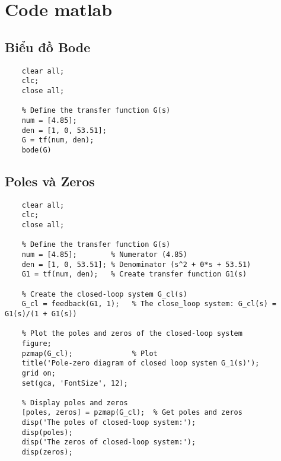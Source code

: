 \chapter{Code matlab}
    \section{Biểu đồ Bode}
    \begin{lstlisting}[caption={Code vẽ biểu đồ Bode}, label={lst:bode}]
    % Delete all variables and close all figures
    clear all;
    clc;
    close all;

    % Define the transfer function G(s)
    num = [4.85];
    den = [1, 0, 53.51];
    G = tf(num, den);
    bode(G)
    \end{lstlisting}
    \section{Poles và Zeros}
    \begin{lstlisting}[caption={Code vẽ poles và zeros}, label={lst:pz}]
    % Delete all variables and close all figures
    clear all;
    clc;
    close all;
    
    % Define the transfer function G(s)
    num = [4.85];        % Numerator (4.85)
    den = [1, 0, 53.51]; % Denominator (s^2 + 0*s + 53.51)
    G1 = tf(num, den);   % Create transfer function G1(s)
    
    % Create the closed-loop system G_cl(s)
    G_cl = feedback(G1, 1);   % The close_loop system: G_cl(s) = G1(s)/(1 + G1(s))
    
    % Plot the poles and zeros of the closed-loop system
    figure;
    pzmap(G_cl);              % Plot
    title('Pole-zero diagram of closed loop system G_1(s)');
    grid on;
    set(gca, 'FontSize', 12);
    
    % Display poles and zeros
    [poles, zeros] = pzmap(G_cl);  % Get poles and zeros
    disp('The poles of closed-loop system:');
    disp(poles);
    disp('The zeros of closed-loop system:');
    disp(zeros);
    \end{lstlisting}
